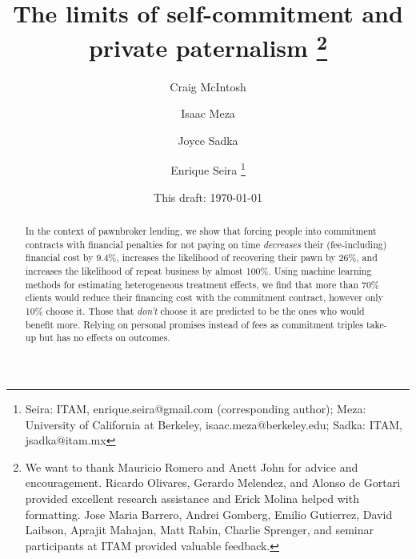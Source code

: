 \documentclass[oneside,11pt]{article}
\begin{document}
\title{The limits of self-commitment and private paternalism \thanks{We want to thank Mauricio Romero and Anett John for advice and encouragement. Ricardo Olivares, Gerardo Melendez, and Alonso de Gortari provided excellent research assistance and Erick Molina helped with formatting. Jose Maria Barrero, Andrei Gomberg, Emilio Gutierrez, David Laibson, Aprajit Mahajan, Matt Rabin, Charlie Sprenger, and seminar participants at ITAM provided valuable feedback.}}
\author{Craig McIntosh \and Isaac Meza \and Joyce Sadka \and Enrique Seira   \thanks{Seira: ITAM, enrique.seira@gmail.com (corresponding author); Meza: University of California at Berkeley, isaac.meza@berkeley.edu; Sadka: ITAM, jsadka@itam.mx} }
\date{This draft:  \today \\[2 cm]}



\maketitle
\thispagestyle{empty}
\begin{abstract}


In the context of pawnbroker lending, we show that forcing people into commitment contracts with financial penalties for not paying on time \textit{decreases} their (fee-including) financial cost by 9.4\%, increases the likelihood of recovering their pawn by 26\%, and increases the likelihood of repeat business by almost 100\%. Using machine learning methods for estimating heterogeneous treatment effects, we find that more than {70}\% clients would reduce their financing cost with the commitment contract, however only 10\% choose it. Those that \textit{don't} choose it are predicted to be the ones who would benefit more. Relying on personal promises instead of fees as commitment triples take-up but has no effects on outcomes.


\end{abstract}
\end{document}
